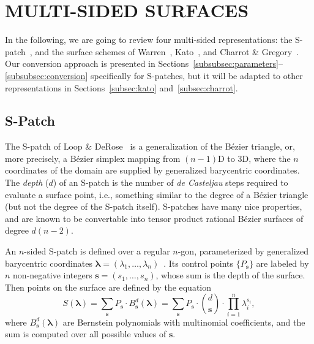 \documentclass[9pt,academicons]{article}
\begin{document}
\section{MULTI-SIDED SURFACES}
\label{sec:multisided}
In the following, we are going to review four multi-sided representations:
the S-patch~\cite{Loop:1989}, and the surface schemes of Warren~\cite{Warren:1992},
Kato~\cite{Kato:1991}, and Charrot \& Gregory~\cite{Charrot:1984}.
Our conversion approach is presented in
Sections~\ref{subsubsec:parameters}--\ref{subsubsec:conversion}
specifically for S-patches, but it will be adapted to other representations in
Sections~\ref{subsec:kato} and~\ref{subsec:charrot}.

\subsection{S-Patch}
\label{subsec:spatch}
The S-patch of Loop \& DeRose~\cite{Loop:1989} is a generalization of the B\'ezier triangle, or,
more precisely, a B\'ezier simplex mapping from $(n-1)$D to 3D, where the $n$ coordinates of the
domain are supplied by generalized barycentric coordinates. The \emph{depth} ($d$) of an S-patch
is the number of \emph{de Casteljau} steps required to evaluate a surface point, i.e.,
something similar
to the degree of a B\'ezier triangle (but not the degree of the S-patch itself).
S-patches have many nice properties, and are known to be convertable into tensor product
rational B\'ezier surfaces of degree $d(n-2)$.

An $n$-sided S-patch is defined over a regular $n$-gon, parameterized by generalized
barycentric coordinates $\mathbf{\lambda}=(\lambda_1,\dots,\lambda_n)$~\cite{Floater:2015}.
Its control
points $\{P_\mathbf{s}\}$ are labeled by $n$ non-negative integers $\mathbf{s}=(s_1,\dots,s_n)$,
whose sum is the depth of the surface. Then points on the surface are defined by
the equation
\begin{equation}
  \label{eq:spatch}
  S(\mathbf{\lambda})=\sum_{\mathbf{s}}P_\mathbf{s}\cdot B_\mathbf{s}^d(\mathbf{\lambda})
  =\sum_{\mathbf{s}}P_\mathbf{s}\cdot {d\choose\mathbf{s}}\cdot\prod_{i=1}^n\lambda_i^{s_i},
\end{equation}
where $B_\mathbf{s}^d(\mathbf{\lambda})$ are Bernstein polynomials with multinomial coefficients,
and the sum is computed over all possible values of $\mathbf{s}$.
\end{document}
